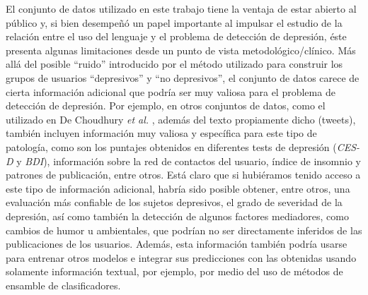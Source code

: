El conjunto de datos utilizado en este trabajo tiene la ventaja de estar abierto al público y, si bien desempeñó un papel importante al impulsar el estudio de la relación entre el uso del lenguaje y el problema de detección de depresión, éste presenta algunas limitaciones desde un punto de vista metodológico/clínico.
Más allá del posible ``ruido'' introducido por el método utilizado para construir los grupos de usuarios  ``depresivos'' y ``no depresivos'', el conjunto de datos carece de cierta información adicional que podría ser muy valiosa para el problema de detección de depresión.
Por ejemplo, en otros conjuntos de datos, como el utilizado en De Choudhury \emph{et al.} \cite{de2013social}, además del texto propiamente dicho (tweets), también incluyen información muy valiosa y específica para este tipo de patología, como son los puntajes obtenidos en diferentes tests de depresión (\emph{CES-D} y \emph{BDI}), información sobre la red de contactos del usuario, índice de insomnio y patrones de publicación, entre otros.
Está claro que si hubiéramos tenido acceso a este tipo de información adicional, habría sido posible obtener, entre otros, una evaluación más confiable de los sujetos depresivos, el grado de severidad de la depresión, así como también la detección de algunos factores mediadores, como cambios de humor u ambientales, que podrían no ser directamente inferidos de las publicaciones de los usuarios.
Además, esta información también podría usarse para entrenar otros modelos e integrar sus predicciones con las obtenidas usando solamente información textual, por ejemplo, por medio del uso de métodos de ensamble de clasificadores.

